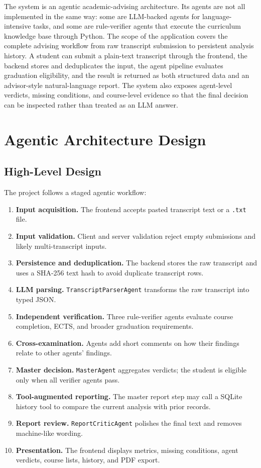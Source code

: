 \documentclass[11pt,a4paper]{article}
\begin{document}
The system is an agentic academic-advising architecture. Its agents are not all
implemented in the same way: some are LLM-backed agents for language-intensive
tasks, and some are rule-verifier agents that execute the curriculum knowledge
base through Python. The scope of the application covers the complete advising
workflow from raw transcript submission to persistent analysis history. A
student can submit a plain-text transcript through the frontend, the backend
stores and deduplicates the input, the agent pipeline evaluates graduation
eligibility, and the result is returned as both structured data and an
advisor-style natural-language report. The system also exposes agent-level
verdicts, missing conditions, and course-level evidence so that the final
decision can be inspected rather than treated as an LLM answer.


\section{Agentic Architecture Design}

\subsection{High-Level Design}

The project follows a staged agentic workflow:

\begin{enumerate}
  \item \textbf{Input acquisition.} The frontend accepts pasted transcript text
  or a \texttt{.txt} file.
  \item \textbf{Input validation.} Client and server validation reject empty
  submissions and likely multi-transcript inputs.
  \item \textbf{Persistence and deduplication.} The backend stores the raw
  transcript and uses a SHA-256 text hash to avoid duplicate transcript rows.
  \item \textbf{LLM parsing.} \texttt{TranscriptParserAgent} transforms the raw
  transcript into typed JSON.
  \item \textbf{Independent verification.} Three rule-verifier agents evaluate
  course completion, ECTS, and broader graduation requirements.
  \item \textbf{Cross-examination.} Agents add short comments on how their
  findings relate to other agents' findings.
  \item \textbf{Master decision.} \texttt{MasterAgent} aggregates verdicts; the
  student is eligible only when all verifier agents pass.
  \item \textbf{Tool-augmented reporting.} The master report step may call a
  SQLite history tool to compare the current analysis with prior records.
  \item \textbf{Report review.} \texttt{ReportCriticAgent} polishes the final
  text and removes machine-like wording.
  \item \textbf{Presentation.} The frontend displays metrics, missing
  conditions, agent verdicts, course lists, history, and PDF export.
\end{enumerate}
\end{document}
